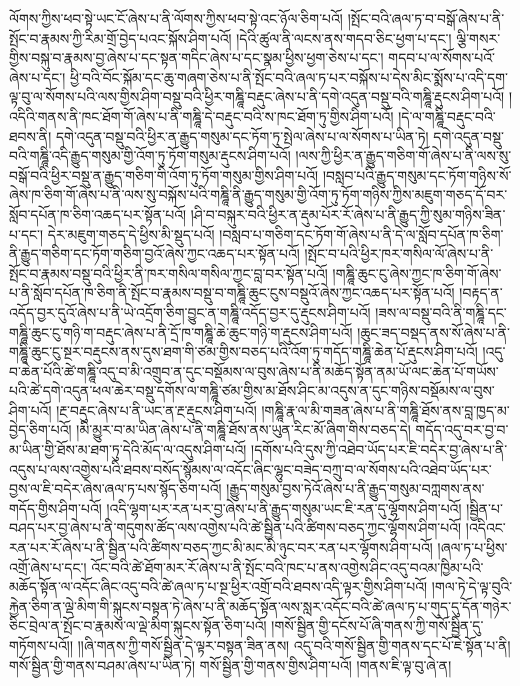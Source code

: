 ལོགས་ཀྱིས་ཕབ་སྟེ་ཡང་ངོ་ཞེས་པ་ནི་ལོགས་ཀྱིས་ཕབ་སྟེ་འང་ཉོལ་ཅིག་པའོ། །སྤོང་བའི་ཞལ་ཏ་བ་བསྒོ་ཞེས་པ་ནི་སྤོང་བ་རྣམས་ཀྱི་རིམ་གྲོ་བྱེད་པའང་སྐོས་ཤིག་པའོ། །དེའི་ཚུལ་ནི་ལངས་ནས་གདབ་ཅིང་ཕྱག་པ་དང་། ལྕི་གསར་གྱིས་བསྐུ་བ་རྣམས་བྱ་ཞེས་པ་དང་སྟན་གདིང་ཞེས་པ་དང་སྣམ་ཕྱིས་ཕྱག་ཅེས་པ་དང་། གདབ་པ་ལ་སོགས་པའོ་ཞེས་པ་དང་། ཕྱི་བའི་བོང་སྐོམ་དང་ཆུ་གཞག་ཅེས་པ་ནི་སྤོང་བའི་ཞལ་ཏ་པར་བསྐོས་པ་དེས་མིང་སྨོས་པ་འདི་དག་ལྟ་བུ་ལ་སོགས་པའི་ལས་གྱིས་ཤིག་བསྡུ་བའི་ཕྱིར་གཎྜཱི་བརྡུང་ཞེས་པ་ནི་དགེ་འདུན་བསྡུ་བའི་གཎྜཱི་རྡུངས་ཤིག་པའོ། །འདིའི་གནས་ནི་ཁང་ཐོག་གོ་ཞེས་པ་ནི་གཎྜཱི་དེ་བརྡུང་བའི་ས་ཁང་ཐོག་ཏུ་གྱིས་ཤིག་པའོ། །དེ་ལ་གཎྜཱི་བརྡུང་བའི་ཐབས་ནི། དགེ་འདུན་བསྡུ་བའི་ཕྱིར་ན་རྒྱུད་གསུམ་དང་ཏོག་ཏུ་སྤེལ་ཞེས་པ་ལ་སོགས་པ་ཡིན་ཏེ། དགེ་འདུན་བསྡུ་བའི་གཎྜཱི་འདི་རྒྱུད་གསུམ་གྱི་འོག་ཏུ་ཏོག་གསུམ་རྡུངས་ཤིག་པའོ། །ལས་ཀྱི་ཕྱིར་ན་རྒྱུད་གཅིག་གོ་ཞེས་པ་ནི་ལས་སུ་བསྒོ་བའི་ཕྱིར་བསྡུ་ན་རྒྱུད་གཅིག་གི་འོག་ཏུ་ཏོག་གསུམ་གྱིས་ཤིག་པའོ། །བསླབ་པའི་རྒྱུད་གསུམ་དང་ཏོག་གཉིས་སོ་ཞེས་ཁ་ཅིག་གོ་ཞེས་པ་ནི་ལས་སུ་བསྐོས་པའི་གཎྜཱི་ནི་རྒྱུད་གསུམ་གྱི་འོག་ཏུ་ཏོག་གཉིས་ཀྱིས་མཇུག་གཅད་དོ་བར་སློབ་དཔོན་ཁ་ཅིག་འཆད་པར་སྟོན་པའོ། །ཤི་བ་བསྐུར་བའི་ཕྱིར་ན་རྡུམ་པོར་རོ་ཞེས་པ་ནི་རྒྱུད་ཀྱི་སུམ་གཉིས་ཟིན་པ་དང་། དེར་མཇུག་གཅད་དེ་ཕྱིས་མི་སྡུད་པའོ། །བསླབ་པ་གཅིག་དང་ཏོག་གོ་ཞེས་པ་ནི་དེ་ལ་སློབ་དཔོན་ཁ་ཅིག་ནི་རྒྱུད་གཅིག་དང་ཏོག་གཅིག་བྱའོ་ཞེས་ཀྱང་འཆད་པར་སྟོན་པའོ། །སྤོང་བ་པའི་ཕྱིར་ཁར་གསིལ་ལོ་ཞེས་པ་ནི་སྤོང་བ་རྣམས་བསྡུ་བའི་ཕྱིར་ནི་ཁར་གསིལ་གསིལ་ཀྱང་བླ་བར་སྟོན་པའོ། །གཎྜཱི་ཆུང་ངུ་ཞེས་ཀྱང་ཁ་ཅིག་གོ་ཞེས་པ་ནི་སློབ་དཔོན་ཁ་ཅིག་ནི་སྤོང་བ་རྣམས་བསྡུ་བ་གཎྜཱི་ཆུང་ངུས་བསྡུའོ་ཞེས་ཀྱང་འཆད་པར་སྟོན་པའོ། །བརྟད་ན་འདོད་བྱར་དུའོ་ཞེས་པ་ནི་ཡེ་འདྲོག་ཅིག་བྱུང་ན་གཎྜཱི་འདོད་བྱར་དུ་རྡུངས་ཤིག་པའོ། །ཟས་ལ་བསྡུ་བའི་ནི་གཎྜཱི་དང་གཎྜཱི་ཆུང་ངུ་གཉི་ག་བརྡུང་ཞེས་པ་ནི་དྲོ་ཁ་གཎྜཱི་ཆེ་ཆུང་གཉི་ག་རྡུངས་ཤིག་པའོ། །ཆུང་ཟད་བསྡད་ནས་སོ་ཞེས་པ་ནི་གཎྜཱི་ཆུང་ངུ་སྔར་བརྡུངས་ནས་དུས་ཐག་གི་ཙམ་གྱིས་བཅད་པའི་འོག་ཏུ་གདོད་གཎྜཱི་ཆེན་པོ་རྡུངས་ཤིག་པའོ། །འདུ་བ་ཆེན་པོའི་ཚེ་གཎྜཱི་འདུ་བ་མི་འགྲུབ་ན་དུང་བསྡོམས་ལ་བུས་ཞེས་པ་ནི་མཆོད་སྟོན་ནམ་ཡོ་ལང་ཆེན་པོ་གཡོས་པའི་ཚེ་དགེ་འདུན་ཕལ་ཆེར་བསྡུ་དགོས་ལ་གཎྜཱི་ཙམ་གྱིས་མ་ཐོས་ཤིང་མ་འདུས་ན་དུང་གཉིས་བསྡོམས་ལ་བུས་ཤིག་པའོ། །རྔ་བརྡུང་ཞེས་པ་ནི་ཡང་ན་རྔ་རྡུངས་ཤིག་པའོ། །གཎྜཱི་རྣ་ལ་མི་གཟན་ཞེས་པ་ནི་གཎྜཱི་ཐོས་ནས་བླ་ཁྱད་མ་བྱེད་ཅིག་པའོ། །མི་མྱུར་བ་མ་ཡིན་ཞེས་པ་ནི་གཎྜཱི་ཐོས་ནས་ཡུན་རིང་མོ་ཞིག་གིས་བཅད་དེ། གདོད་འདུ་བར་བྱ་བ་མ་ཡིན་གྱི་ཐོས་མ་ཐག་ཏུ་དེའི་མོད་ལ་འདུས་ཤིག་པའོ། །དགོས་པའི་དུས་ཀྱི་འཐེབ་ཡོད་པར་ཇི་བདེར་བྱ་ཞེས་པ་ནི་འདུས་པ་ལས་འགྱེས་པའི་ཐབས་བསོད་སྙོམས་ལ་འདོང་ཞིང་ལྷུང་བཟེད་བཀྲུ་བ་ལ་སོགས་པའི་འཐེབ་ཡོད་པར་བྱས་ལ་ཇི་བདེར་ཞེས་ཞལ་ཏ་པས་སྙོད་ཅིག་པའོ། །རྒྱུད་གསུམ་བྱས་ཏེའོ་ཞེས་པ་ནི་རྒྱུད་གསུམ་བཀླགས་ནས་གདོད་གྱིས་ཤིག་པའོ། །འདི་ལྷག་པར་རན་པར་བྱ་ཞེས་པ་ནི་རྒྱུད་གསུམ་ཡང་ཇི་རན་དུ་ལྷོགས་ཤིག་པའོ། །སྦྱིན་པ་བཤད་པར་བྱ་ཞེས་པ་ནི་གདུགས་ཚོད་ལས་འགྱེས་པའི་ཚེ་སྦྱིན་པའི་ཚིགས་བཅད་ཀྱང་ལྷོགས་ཤིག་པའོ། །འདིའང་རན་པར་རོ་ཞེས་པ་ནི་སྦྱིན་པའི་ཚིགས་བཅད་ཀྱང་མི་མང་མི་ཉུང་བར་རན་པར་ལྷོགས་ཤིག་པའོ། །ཞལ་ཏ་པ་ཕྱིས་འགྲོ་ཞེས་པ་དང་། འོང་བའི་ཚེ་ཐོག་མར་རོ་ཞེས་པ་ནི་སྤོང་བའི་ཁང་པ་ནས་འགྱེས་ཤིང་འདུ་བའམ་ཁྱིམ་པའི་མཆོད་སྟོན་ལ་འདོང་ཞིང་འདུ་བའི་ཚེ་ཞལ་ཏ་པ་སྔ་ཕྱིར་འགྲོ་བའི་ཐབས་འདི་ལྟར་གྱིས་ཤིག་པའོ། །གལ་ཏེ་དེ་ལྟ་བུའི་རྐྱེན་ཅིག་ན་ལྡེ་མིག་གི་སྐུངས་བསྟན་ཏེ་ཞེས་པ་ནི་མཆོད་སྟོན་ལས་སླར་འདོང་བའི་ཚེ་ཞལ་ཏ་པ་གུད་དུ་དོན་གཉེར་ཅིང་བྲེལ་ན་སྤོང་བ་རྣམས་ལ་ལྡེ་མིག་སྐུངས་སྟོན་ཅིག་པའོ། །གསོ་སྦྱིན་གྱི་དངོས་པོ་ཞི་གནས་ཀྱི་གསོ་སྦྱིན་དུ་གཏོགས་པའོ།། །།ཞི་གནས་ཀྱི་གསོ་སྦྱིན་དེ་ལྟར་བསྟན་ཟིན་ནས། འདུ་བའི་གསོ་སྦྱིན་གྱི་གནས་དང་པོ་ཇེ་སྟོན་པ་ནི། གསོ་སྦྱིན་གྱི་གནས་བཤམ་ཞེས་པ་ཡིན་ཏེ། གསོ་སྦྱིན་གྱི་གནས་གྱིས་ཤིག་པའོ། །གནས་ཇི་ལྟ་བུ་ཞེ་ན། 